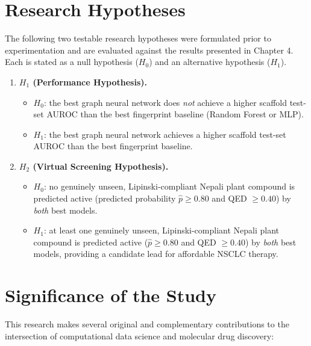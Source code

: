 \section{Research Hypotheses}

The following two testable research hypotheses were formulated prior to
experimentation and are evaluated against the results presented in Chapter 4. Each is
stated as a null hypothesis ($H_0$) and an alternative hypothesis ($H_1$).

\begin{enumerate}
    \item \textbf{$H_1$ (Performance Hypothesis).}
    \begin{itemize}
        \item $H_0$: the best graph neural network does \emph{not} achieve a higher
        scaffold test-set AUROC than the best fingerprint baseline (Random Forest or MLP).
        \item $H_1$: the best graph neural network achieves a higher scaffold test-set
        AUROC than the best fingerprint baseline.
    \end{itemize}

    \item \textbf{$H_2$ (Virtual Screening Hypothesis).}
    \begin{itemize}
        \item $H_0$: no genuinely unseen, Lipinski-compliant Nepali plant compound is
        predicted active (predicted probability $\hat{p} \geq 0.80$ and QED $\geq 0.40$)
        by \emph{both} best models.
        \item $H_1$: at least one genuinely unseen, Lipinski-compliant Nepali plant
        compound is predicted active ($\hat{p} \geq 0.80$ and QED $\geq 0.40$) by
        \emph{both} best models, providing a candidate lead for affordable NSCLC therapy.
    \end{itemize}
\end{enumerate}

\section{Significance of the Study}

This research makes several original and complementary contributions to the
intersection of computational data science and molecular drug discovery:


